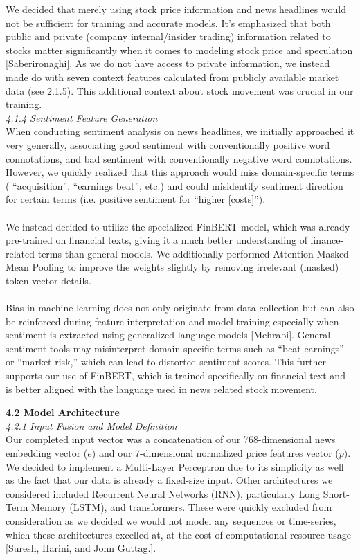 \documentclass[letterpaper,12pt, twocolumn]{report}
\begin{document}
We decided that merely using stock price information and news headlines would not be sufficient for training and accurate models. It’s emphasized that both public and private (company internal/insider trading) information related to stocks matter significantly when it comes to modeling stock price and speculation [Saberironaghi]. As we do not have access to private information, we instead made do with seven context features calculated from publicly available market data (see 2.1.5). This additional context about stock movement was crucial in our training. \\


\noindent
\textit{4.1.4 Sentiment Feature Generation}\\
When conducting sentiment analysis on news headlines, we initially approached it very generally, associating good sentiment with conventionally positive word connotations, and bad sentiment with conventionally negative word connotations. However, we quickly realized that this approach would miss domain-specific terms ( “acquisition”, “earnings beat”, etc.) and could misidentify sentiment direction for certain terms (i.e. positive sentiment for “higher [costs]”). \\\\
We instead decided to utilize the specialized FinBERT model, which was already pre-trained on financial texts, giving it a much better understanding of finance-related terms than general models. We additionally performed Attention-Masked Mean Pooling to improve the weights slightly by removing irrelevant (masked) token vector details.\\\\
Bias in machine learning does not only originate from data collection but can also be reinforced during feature interpretation and model training especially when sentiment is extracted using generalized language models [Mehrabi]. General sentiment tools may misinterpret domain-specific terms such as “beat earnings” or “market risk,” which can lead to distorted sentiment scores. This further supports our use of FinBERT, which is trained specifically on financial text and is better aligned with the language used in news related stock movement.

\noindent
\textbf{4.2 Model Architecture}\\
\textit{4.2.1 Input Fusion and Model Definition}\\
Our completed input vector was a concatenation of our 768-dimensional news embedding vector ($e$) and our 7-dimensional normalized price features vector ($p$). We decided to implement a Multi-Layer Perceptron due to its simplicity as well as the fact that our data is already a fixed-size input. Other architectures we considered included Recurrent Neural Networks (RNN), particularly Long Short-Term Memory (LSTM), and transformers. These were quickly excluded from consideration as we decided we would not model any sequences or time-series, which these architectures excelled at, at the cost of computational resource usage [Suresh, Harini, and John Guttag.].\\
\end{document}
